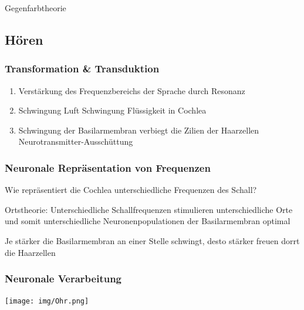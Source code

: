 \rightarrow Gegenfarbtheorie
\subsection{Hören}
\subsubsection{Transformation \& Transduktion}
\begin{enumerate}
	\item Verstärkung des Frequenzbereichs der Sprache durch Resonanz
	\item Schwingung Luft \rightarrow Schwingung Flüssigkeit in Cochlea
	\item Schwingung der Basilarmembran verbiegt die Zilien der  Haarzellen \rightarrow Neurotransmitter-Ausschüttung 
\end{enumerate}
\subsubsection{Neuronale Repräsentation von Frequenzen}
Wie repräsentiert die Cochlea unterschiedliche Frequenzen des Schall?

Ortstheorie: Unterschiedliche Schallfrequenzen stimulieren unterschiedliche Orte und somit unterschiedliche Neuronenpopulationen der Basilarmembran optimal

\rightarrow Je stärker die Basilarmembran an einer Stelle schwingt, desto stärker freuen dorrt die Haarzellen 

\subsubsection{Neuronale Verarbeitung}
\begin{center}
	\texttt{[image: img/Ohr.png]}
\end{center}

